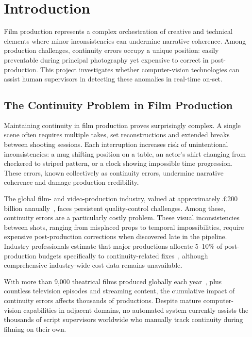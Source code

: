 \chapter{Introduction}
\label{ch:introduction}

Film production represents a complex orchestration of creative and technical elements where minor inconsistencies can undermine narrative coherence. Among production challenges, continuity errors occupy a unique position: easily preventable during principal photography yet expensive to correct in post-production. This project investigates whether computer-vision technologies can assist human supervisors in detecting these anomalies in real-time on-set.

\section{The Continuity Problem in Film Production}
\label{sec:continuity_problem}

Maintaining continuity in film production proves surprisingly complex. A single scene often requires multiple takes, set reconstructions and extended breaks between shooting sessions. Each interruption increases risk of unintentional inconsistencies: a mug shifting position on a table, an actor's shirt changing from checkered to striped pattern, or a clock showing impossible time progression. These errors, known collectively as continuity errors, undermine narrative coherence and damage production credibility.

The global film- and video-production industry, valued at approximately £200 billion annually~\cite{businessresearch2025}, faces persistent quality-control challenges. Among these, continuity errors are a particularly costly problem. These visual inconsistencies between shots, ranging from misplaced props to temporal impossibilities, require expensive post-production corrections when discovered late in the pipeline. Industry professionals estimate that major productions allocate 5–10\% of post-production budgets specifically to continuity-related fixes~\cite{filmustage2024}, although comprehensive industry-wide cost data remains unavailable.

With more than 9,000 theatrical films produced globally each year~\cite{wipo2025}, plus countless television episodes and streaming content, the cumulative impact of continuity errors affects thousands of productions. Despite mature computer-vision capabilities in adjacent domains, no automated system currently assists the thousands of script supervisors worldwide who manually track continuity during filming on their own.

